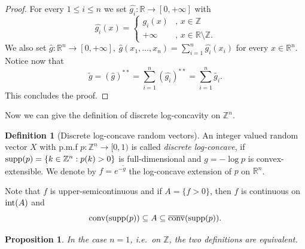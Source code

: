 \documentclass[11pt,a4paper]{article} %
\newtheorem{proposition}[theorem]{Proposition}
\theoremstyle{definition}
\newtheorem{definition}[theorem]{Definition}
\theoremstyle{remark}
\newcommand{\conv}{\mathrm{conv}}
\newcommand{\1}{\mathds{1}}
\begin{document}
\begin{proof}
    For every $1 \leq i \leq n$ we set $\hat{g_i}: \mathbb{R} \to [0,+\infty]$ with  $$ \hat{g_i}(x) =
    \begin{cases}
    g_i(x) & \text{, } x \in \mathbb{Z} \\
    +\infty & \text{, } x \in \mathbb{R} \setminus \mathbb{Z}.
    \end{cases}$$ We also set $\hat{g}: \mathbb{R}^n \to [0,+\infty], \ \hat{g}(x_1,\ldots,x_n)=\sum\limits_{i=1}^n \hat{g_i}(x_i)$ for every $x \in \mathbb{R}^n$. Notice now that $$\tilde{g}=(\hat{g})^{\ast \ast}=\sum\limits_{i=1}^{n} (\hat{g_i})^{\ast \ast}=\sum\limits_{i=1}^{n}\tilde{g_i}.$$  This concludes the proof. 
\end{proof}

Now we can give the definition of discrete log-concavity on $\mathbb{Z}^n$.

\begin{definition}[Discrete log-concave random vectors]\label{def:discrete-log-vectors} An integer valued random vector $X$ with p.m.f $p: \mathbb{Z}^n \to [0,1)$ is called  \textit{discrete log-concave}, if ${\rm supp}(p)=\{k \in \mathbb{Z}^n: p(k)>0\} $ is full-dimensional and $g=- \log p$ is convex-extensible. We denote by $f=e^{-\tilde{g}}$ the log-concave extension of $p$ on $\mathbb{R}^n$.

\end{definition}

Note that $f$ is upper-semicontinuous and if $A=\{f>0\}$, then $f$ is continuous on ${\rm int}(A)$ and $$\conv({\rm supp}(p)) \subseteq A \subseteq \overline{\conv}({\rm supp}(p)).$$

\begin{proposition}\label{prop:equivalence} In the case $n=1$, i.e.\ on $\mathbb{Z}$, the two definitions are equivalent.
    
\end{proposition}
\end{document}
